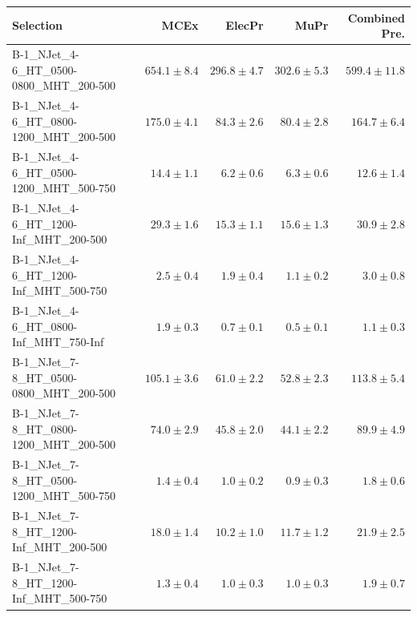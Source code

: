 \documentclass{beamer}
\begin{document}
\begin{frame}
\tiny
\begin{tabular}{lrrrr}
\toprule

                                                Selection  &                     MCEx  &           ElecPr  &             MuPr  &          Combined Pre.  \\
\midrule
     B-1\_NJet\_4-6\_HT\_0500-0800\_MHT\_200-500 &             $654.1\pm8.4$&             $296.8\pm4.7$&             $302.6\pm5.3$&                $599.4\pm11.8$ \\
      B-1\_NJet\_4-6\_HT\_0800-1200\_MHT\_200-500 &             $175.0\pm4.1$&              $84.3\pm2.6$&              $80.4\pm2.8$&                 $164.7\pm6.4$ \\
      B-1\_NJet\_4-6\_HT\_0500-1200\_MHT\_500-750 &              $14.4\pm1.1$&               $6.2\pm0.6$&               $6.3\pm0.6$&                  $12.6\pm1.4$ \\
       B-1\_NJet\_4-6\_HT\_1200-Inf\_MHT\_200-500 &              $29.3\pm1.6$&              $15.3\pm1.1$&              $15.6\pm1.3$&                  $30.9\pm2.8$ \\
       B-1\_NJet\_4-6\_HT\_1200-Inf\_MHT\_500-750 &               $2.5\pm0.4$&               $1.9\pm0.4$&               $1.1\pm0.2$&                   $3.0\pm0.8$ \\
       B-1\_NJet\_4-6\_HT\_0800-Inf\_MHT\_750-Inf &               $1.9\pm0.3$&               $0.7\pm0.1$&               $0.5\pm0.1$&                   $1.1\pm0.3$ \\
      B-1\_NJet\_7-8\_HT\_0500-0800\_MHT\_200-500 &             $105.1\pm3.6$&              $61.0\pm2.2$&              $52.8\pm2.3$&                 $113.8\pm5.4$ \\
      B-1\_NJet\_7-8\_HT\_0800-1200\_MHT\_200-500 &              $74.0\pm2.9$&              $45.8\pm2.0$&              $44.1\pm2.2$&                  $89.9\pm4.9$ \\
      B-1\_NJet\_7-8\_HT\_0500-1200\_MHT\_500-750 &               $1.4\pm0.4$&               $1.0\pm0.2$&               $0.9\pm0.3$&                   $1.8\pm0.6$ \\
       B-1\_NJet\_7-8\_HT\_1200-Inf\_MHT\_200-500 &              $18.0\pm1.4$&              $10.2\pm1.0$&              $11.7\pm1.2$&                  $21.9\pm2.5$ \\
       B-1\_NJet\_7-8\_HT\_1200-Inf\_MHT\_500-750 &               $1.3\pm0.4$&               $1.0\pm0.3$&               $1.0\pm0.3$&                   $1.9\pm0.7$ \\

\end{tabular}
\end{frame}
\end{document}
